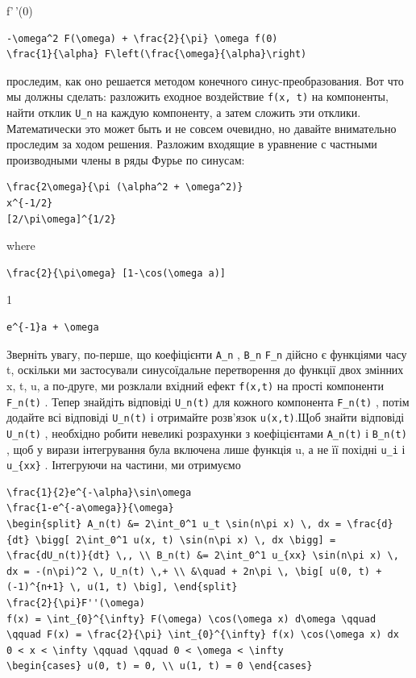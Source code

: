 \documentclass[
  ukrainian,
]{article}
\begin{document}
f'\,'(0)

\begin{verbatim}
-\omega^2 F(\omega) + \frac{2}{\pi} \omega f(0)
\frac{1}{\alpha} F\left(\frac{\omega}{\alpha}\right)
\end{verbatim}

проследим, как оно решается методом конечного синус-преобразования. Вот
что мы должны сделать: разложить еходное воздействие \texttt{f(x,\ t)}
на компоненты, найти отклик \texttt{U\_n} на каждую компоненту, а затем
сложить эти отклики. Математически это может быть и не совсем очевидно,
но давайте внимательно проследим за ходом решения. Разложим входящие в
уравнение с частными производными члены в ряды Фурье по синусам:

\begin{verbatim}
\frac{2\omega}{\pi (\alpha^2 + \omega^2)}
x^{-1/2}
[2/\pi\omega]^{1/2}
\end{verbatim}

where

\begin{verbatim}
\frac{2}{\pi\omega} [1-\cos(\omega a)]
\end{verbatim}

1

\begin{verbatim}
e^{-1}a + \omega
\end{verbatim}

Зверніть увагу, по-перше, що коефіцієнти \texttt{A\_n} , \texttt{B\_n}
\texttt{F\_n} дійсно є функціями часу t, оскільки ми застосували
синусоїдальне перетворення до функції двох змінних x, t, u, а по-друге,
ми розклали вхідний ефект \texttt{f(x,t)} на прості компоненти
\texttt{F\_n(t)} . Тепер знайдіть відповіді \texttt{U\_n(t)} для кожного
компонента \texttt{F\_n(t)} , потім додайте всі відповіді
\texttt{U\_n(t)} і отримайте розв'язок \texttt{u(x,t)}.Щоб знайти
відповіді \texttt{U\_n(t)} , необхідно робити невеликі розрахунки з
коефіцієнтами \texttt{A\_n(t)} і \texttt{B\_n(t)} , щоб у вирази
інтегрування була включена лише функція u, а не її похідні \texttt{u\_i}
і \texttt{u\_\{xx\}} . Інтегруючи на частини, ми отримуємо

\begin{verbatim}
\frac{1}{2}e^{-\alpha}\sin\omega
\frac{1-e^{-a\omega}}{\omega}
\begin{split} A_n(t) &= 2\int_0^1 u_t \sin(n\pi x) \, dx = \frac{d}{dt} \bigg[ 2\int_0^1 u(x, t) \sin(n\pi x) \, dx \bigg] = \frac{dU_n(t)}{dt} \,, \\ B_n(t) &= 2\int_0^1 u_{xx} \sin(n\pi x) \, dx = -(n\pi)^2 \, U_n(t) \,+ \\ &\quad + 2n\pi \, \big[ u(0, t) + (-1)^{n+1} \, u(1, t) \big], \end{split}
\frac{2}{\pi}F''(\omega)
f(x) = \int_{0}^{\infty} F(\omega) \cos(\omega x) d\omega \qquad \qquad F(x) = \frac{2}{\pi} \int_{0}^{\infty} f(x) \cos(\omega x) dx
0 < x < \infty \qquad \qquad 0 < \omega < \infty
\begin{cases} u(0, t) = 0, \\ u(1, t) = 0 \end{cases}
\end{verbatim}
\end{document}
